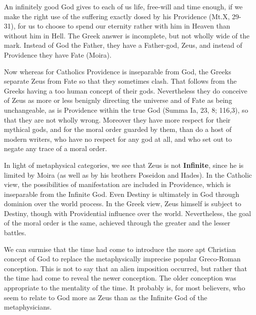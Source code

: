 \begin{quotex}
An infinitely good God gives to each of us life, free-will and time enough, if we make the right use of the suffering exactly dosed by his Providence (Mt.X, 29-31), for us to choose to spend our eternity rather with him in Heaven than without him in Hell. The Greek answer is incomplete, but not wholly wide of the mark. Instead of God the Father, they have a Father-god, Zeus, and instead of Providence they have Fate (Moira).

Now whereas for Catholics Providence is inseparable from God, the Greeks separate Zeus from Fate so that they sometimes clash. That follows from the Greeks having a too human concept of their gods. Nevertheless they do conceive of Zeus as more or less benignly directing the universe and of Fate as being unchangeable, as is Providence within the true God (Summa Ia, 23, 8; 116,3), so that they are not wholly wrong. Moreover they have more respect for their mythical gods, and for the moral order guarded by them, than do a host of modern writers, who have no respect for any god at all, and who set out to negate any trace of a moral order. 

\end{quotex}
In light of metaphysical categories, we see that Zeus is not \textbf{Infinite}, since he is limited by Moira (as well as by his brothers Poseidon and Hades). In the Catholic view, the possibilities of manifestation are included in Providence, which is inseparable from the Infinite God. Even Destiny is ultimately in God through dominion over the world process. In the Greek view, Zeus himself is subject to Destiny, though with Providential influence over the world. Nevertheless, the goal of the moral order is the same, achieved through the greater and the lesser battles.

We can surmise that the time had come to introduce the more apt Christian concept of God to replace the metaphysically imprecise popular Greco-Roman conception. This is not to say that an alien imposition occurred, but rather that the time had come to reveal the newer conception. The older conception was appropriate to the mentality of the time. It probably is, for most believers, who seem to relate to God more as Zeus than as the Infinite God of the metaphysicians.

